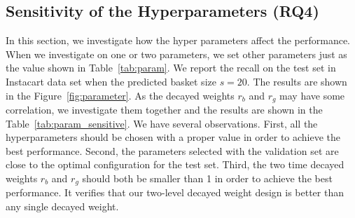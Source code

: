 \documentclass[sigconf]{acmart}
\begin{document}
\begin{table}[ht]
\small
\caption{The effect of each component in the TIFU-KNN.}
\label{exp:comparison3}
\end{table}




\subsection{Sensitivity of the Hyperparameters (RQ4)}

In this section, we investigate how the hyper parameters affect the performance.   When we investigate on one or two parameters,  we set other parameters just as the value shown in Table~\ref{tab:param}. We report the recall on the test set in Instacart data set when the  predicted basket size $s=20$. The results are shown in the Figure~\ref{fig:parameter}. As  the decayed weights $r_b$ and $r_g$ may have  some correlation, we investigate  them together and the results are shown in the Table~\ref{tab:param_sensitive}. We have several observations. 
First, all the hyperparameters should be chosen with a proper value in order to achieve the best performance.  Second, the  parameters  selected with the validation set are close to the optimal  configuration for the test set. Third, the two time decayed weights $r_b$ and $r_g$ should both be smaller than 1 in order to achieve the best performance. It verifies that our two-level decayed weight design is better than any single  decayed weight.  
\end{document}

